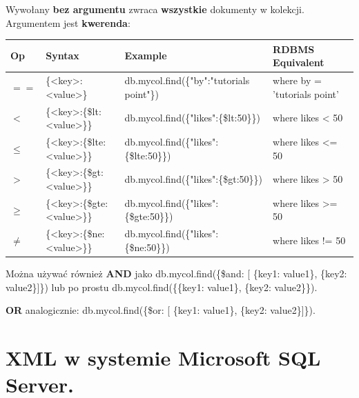 \documentclass[a4paper]{article}
\begin{document}
    Wywołany \textbf{bez argumentu} zwraca \textbf{wszystkie} dokumenty w kolekcji. Argumentem jest \textbf{kwerenda}:
    \begin{table}[H]
        \begin{center}
            \begin{tabular}{| p{0.5cm} || p{4cm} | p{6cm} | p{4.5cm} |}
                \hline
                \textbf{Op} & \textbf{Syntax}             & \textbf{Example}                          & \textbf{RDBMS Equivalent}    \\
                \hline
                \hline
                $==$        & \{<key>:<value>\}           & db.mycol.find(\{"by":"tutorials point"\}) & where by = 'tutorials point' \\
                \hline
                $<$         & \{<key>:\{\$lt:<value>\}\}  & db.mycol.find(\{"likes":\{\$lt:50\}\})    & where likes < 50             \\
                \hline
                $\leq$      & \{<key>:\{\$lte:<value>\}\} & db.mycol.find(\{"likes":\{\$lte:50\}\})   & where likes <= 50            \\
                \hline
                $>$         & \{<key>:\{\$gt:<value>\}\}  & db.mycol.find(\{"likes":\{\$gt:50\}\})    & where likes > 50             \\
                \hline
                $\geq$      & \{<key>:\{\$gte:<value>\}\} & db.mycol.find(\{"likes":\{\$gte:50\}\})   & where likes >= 50            \\
                \hline
                $\neq$      & \{<key>:\{\$ne:<value>\}\}  & db.mycol.find(\{"likes":\{\$ne:50\}\})    & where likes != 50            \\
                \hline
            \end{tabular}
        \end{center}
    \end{table}

    Można używać również \textbf{AND} jako db.mycol.find(\{\$and: [ \{key1: value1\}, \{key2: value2\}]\}) lub po prostu
    db.mycol.find(\{\{key1: value1\}, \{key2: value2\}\}).

    \textbf{OR} analogicznie: db.mycol.find(\{\$or: [ \{key1: value1\}, \{key2: value2\}]\}).
    \


    \section{XML w systemie Microsoft SQL Server.}
\end{document}
